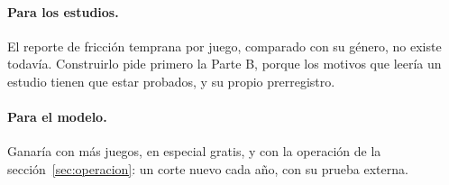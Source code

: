 \paragraph{Para los estudios.} El reporte de fricción temprana por juego, comparado con su género,
no existe todavía. Construirlo pide primero la Parte B, porque los motivos que leería un estudio
tienen que estar probados, y su propio prerregistro.

\paragraph{Para el modelo.} Ganaría con más juegos, en especial gratis, y con la operación de la
sección~\ref{sec:operacion}: un corte nuevo cada año, con su prueba externa.

